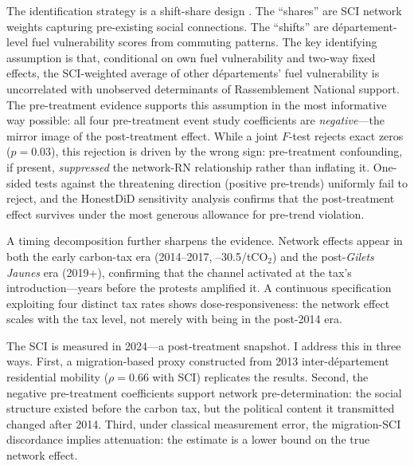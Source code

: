 \documentclass[12pt]{article}
\providecommand{\euro}{\texteuro}
\newcommand{\rn}{Rassemblement National}
\newcommand{\gj}{\textit{Gilets Jaunes}}
\newcommand{\dept}{d\'{e}partement}
\newcommand{\depts}{d\'{e}partements}
\begin{document}
The identification strategy is a shift-share design \citep{goldsmith2020bartik, borusyak2022quasi}. The ``shares'' are SCI network weights capturing pre-existing social connections. The ``shifts'' are \dept{}-level fuel vulnerability scores from commuting patterns. The key identifying assumption is that, conditional on own fuel vulnerability and two-way fixed effects, the SCI-weighted average of other \depts{}' fuel vulnerability is uncorrelated with unobserved determinants of \rn{} support. The pre-treatment evidence supports this assumption in the most informative way possible: all four pre-treatment event study coefficients are \emph{negative}---the mirror image of the post-treatment effect. While a joint $F$-test rejects exact zeros ($p = 0.03$), this rejection is driven by the wrong sign: pre-treatment confounding, if present, \emph{suppressed} the network-RN relationship rather than inflating it. One-sided tests against the threatening direction (positive pre-trends) uniformly fail to reject, and the HonestDiD sensitivity analysis confirms that the post-treatment effect survives under the most generous allowance for pre-trend violation.

A timing decomposition further sharpens the evidence. Network effects appear in both the early carbon-tax era (2014--2017, \euro 7--30.5/tCO$_2$) and the post-\gj{} era (2019+), confirming that the channel activated at the tax's introduction---years before the protests amplified it. A continuous specification exploiting four distinct tax rates shows dose-responsiveness: the network effect scales with the tax level, not merely with being in the post-2014 era.

The SCI is measured in 2024---a post-treatment snapshot. I address this in three ways. First, a migration-based proxy constructed from 2013 inter-\dept{} residential mobility ($\rho = 0.66$ with SCI) replicates the results. Second, the negative pre-treatment coefficients support network pre-determination: the social structure existed before the carbon tax, but the political content it transmitted changed after 2014. Third, under classical measurement error, the migration-SCI discordance implies attenuation: the estimate is a lower bound on the true network effect.
\end{document}
